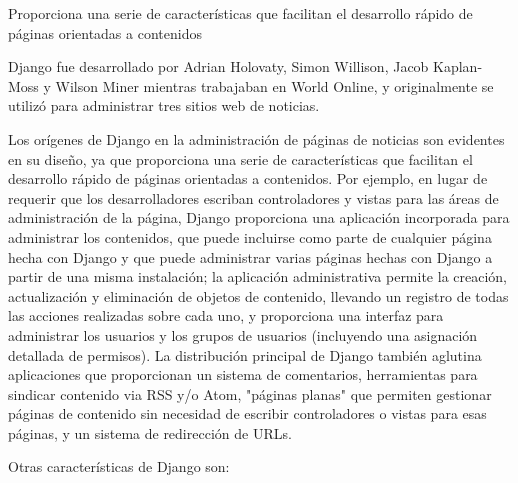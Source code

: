 Proporciona una serie de características que facilitan el desarrollo rápido de páginas orientadas a contenidos

Django fue desarrollado por Adrian Holovaty, Simon Willison, Jacob Kaplan-Moss y Wilson Miner mientras trabajaban en World Online, y originalmente se utilizó para administrar tres sitios web de noticias.

Los orígenes de Django en la administración de páginas de noticias son evidentes en su diseño, ya que proporciona una serie de características que facilitan el desarrollo rápido de páginas orientadas a contenidos. Por ejemplo, en lugar de requerir que los desarrolladores escriban controladores y vistas para las áreas de administración de la página, Django proporciona una aplicación incorporada para administrar los contenidos, que puede incluirse como parte de cualquier página hecha con Django y que puede administrar varias páginas hechas con Django a partir de una misma instalación; la aplicación administrativa permite la creación, actualización y eliminación de objetos de contenido, llevando un registro de todas las acciones realizadas sobre cada uno, y proporciona una interfaz para administrar los usuarios y los grupos de usuarios (incluyendo una asignación detallada de permisos).
La distribución principal de Django también aglutina aplicaciones que proporcionan un sistema de comentarios, herramientas para sindicar contenido via RSS y/o Atom, "páginas planas" que permiten gestionar páginas de contenido sin necesidad de escribir controladores o vistas para esas páginas, y un sistema de redirección de URLs.

Otras características de Django son:

